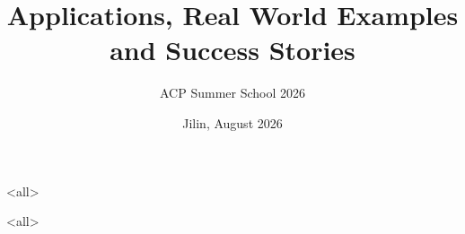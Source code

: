 \title[Applications] %
{Applications, Real World Examples and Success Stories}

\subtitle{ACP Summer School 2026} %
\date{Jilin, August 2026}


\mode<all>{

}
\mode<all>{

}


